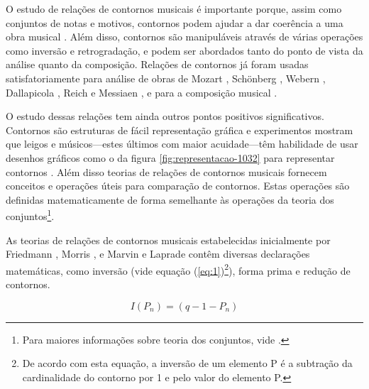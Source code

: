 \documentclass[12pt]{article}
\begin{document}
O estudo de relações de contornos musicais é importante porque, assim
como conjuntos de notas e motivos, contornos podem ajudar a dar
coerência a uma obra musical \cite{clifford95:contour}. Além disso,
contornos são manipuláveis através de várias operações como inversão e
retrogradação, e podem ser abordados tanto do ponto de vista da
análise quanto da composição. Relações de contornos já foram usadas
satisfatoriamente para análise de obras de Mozart
\cite{beard03:contour}, Schönberg \cite{friedmann85:methodology},
Webern \cite{clifford95:contour,sampaio08:analise}, Dallapicola
\cite{marvin88:generalized}, Reich \cite{quinn97:fuzzy} e Messiaen
\cite{schultz08:melodic}, e para a composição musical
\cite{sampaio08:em}.

O estudo dessas relações tem ainda outros pontos positivos
significativos. Contornos são estruturas de fácil representação
gráfica e experimentos mostram que leigos e músicos---estes últimos
com maior acuidade---têm habilidade de usar desenhos gráficos como o
da figura \ref{fig:representacao-1032} para representar contornos
\cite[p. 69]{marvin88:generalized}. Além disso teorias de relações de
contornos musicais fornecem conceitos e operações úteis para
comparação de contornos. Estas operações são definidas matematicamente
de forma semelhante às operações da teoria dos conjuntos\footnote{Para
  maiores informações sobre teoria dos conjuntos, vide
  \cite{straus90:introduction}.}.

As teorias de relações de contornos musicais estabelecidas
inicialmente por Friedmann \cite{friedmann85:methodology}, Morris
\cite{morris87:composition,morris93:directions}, e Marvin e Laprade
\cite{marvin.ea87:relating,marvin88:generalized} contêm diversas
declarações matemáticas, como inversão (vide equação
(\ref{eq:1})\footnote{De acordo com esta equação, a inversão de um
  elemento P é a subtração da cardinalidade do contorno por 1 e pelo
  valor do elemento P.}), forma prima e redução de contornos.

\begin{equation}
  \label{eq:1}
  I(P_n) = (q − 1 − P_n)
\end{equation}
\end{document}
